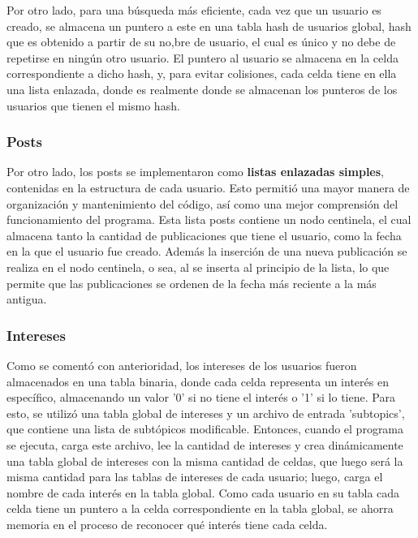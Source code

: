 \documentclass[9pt,letterpaper,onecolumn]{rho-class/rho}
\begin{document}
\vspace{0.5cm}

Por otro lado, para una búsqueda más eficiente, cada vez que un usuario es creado, se almacena un puntero a este en una tabla hash de usuarios global, hash que es obtenido a partir de su no,bre de usuario, el cual es único y no debe de repetirse en ningún otro usuario. El puntero al usuario se almacena en la celda correspondiente a dicho hash, y, para evitar colisiones, cada celda tiene en ella una lista enlazada, donde es realmente donde se almacenan los punteros de los usuarios que tienen el mismo hash.

\subsubsection{Posts}
Por otro lado, los posts se implementaron como \textbf{listas enlazadas simples}, contenidas en la estructura de cada usuario. Esto permitió una mayor manera de organización y mantenimiento del código, así como una mejor comprensión del funcionamiento del programa. Esta lista posts contiene un nodo centinela, el cual almacena tanto la cantidad de publicaciones que tiene el usuario, como la fecha en la que el usuario fue creado. Además la inserción de una nueva publicación se realiza en el nodo centinela, o sea, al se inserta al principio de la lista, lo que permite que las publicaciones se ordenen de la fecha más reciente a la más antigua.

\subsubsection{Intereses}
Como se comentó con anterioridad, los intereses de los usuarios fueron almacenados en una tabla binaria, donde cada celda representa un interés en específico, almacenando un valor '0' si no tiene el interés o '1' si lo tiene. Para esto, se utilizó una tabla global de intereses y un archivo de entrada 'subtopics', que contiene una lista de subtópicos modificable. Entonces, cuando el programa se ejecuta, carga este archivo, lee la cantidad de intereses y crea dinámicamente una tabla global de intereses con la misma cantidad de celdas, que luego será la misma cantidad para las tablas de intereses de cada usuario; luego, carga el nombre de cada interés en la tabla global. Como cada usuario en su tabla cada celda tiene un puntero a la celda correspondiente en la tabla global, se ahorra memoria en el proceso de reconocer qué interés tiene cada celda.
\end{document}
